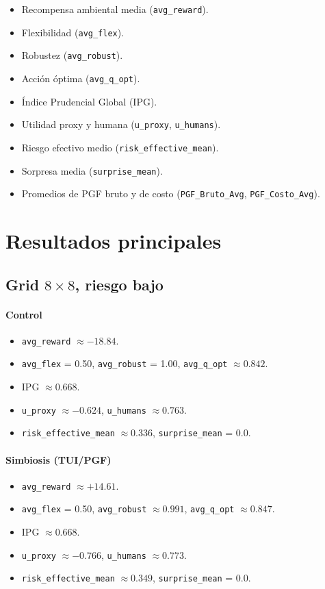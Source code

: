 \documentclass[11pt]{article}
\begin{document}
\begin{itemize}
  \item Recompensa ambiental media (\texttt{avg\_reward}).
  \item Flexibilidad (\texttt{avg\_flex}).
  \item Robustez (\texttt{avg\_robust}).
  \item Acción óptima (\texttt{avg\_q\_opt}).
  \item Índice Prudencial Global (IPG).
  \item Utilidad proxy y humana (\texttt{u\_proxy}, \texttt{u\_humans}).
  \item Riesgo efectivo medio (\texttt{risk\_effective\_mean}).
  \item Sorpresa media (\texttt{surprise\_mean}).
  \item Promedios de PGF bruto y de costo (\texttt{PGF\_Bruto\_Avg}, \texttt{PGF\_Costo\_Avg}).
\end{itemize}

\section{Resultados principales}

\subsection{Grid $8\times 8$, riesgo bajo}

\paragraph{Control}
\begin{itemize}
  \item \texttt{avg\_reward} $\approx -18.84$.
  \item \texttt{avg\_flex} = 0.50, \texttt{avg\_robust} = 1.00, \texttt{avg\_q\_opt} $\approx 0.842$.
  \item IPG $\approx 0.668$.
  \item \texttt{u\_proxy} $\approx -0.624$, \texttt{u\_humans} $\approx 0.763$.
  \item \texttt{risk\_effective\_mean} $\approx 0.336$, \texttt{surprise\_mean} = 0.0.
\end{itemize}

\paragraph{Simbiosis (TUI/PGF)}
\begin{itemize}
  \item \texttt{avg\_reward} $\approx +14.61$.
  \item \texttt{avg\_flex} = 0.50, \texttt{avg\_robust} $\approx 0.991$, \texttt{avg\_q\_opt} $\approx 0.847$.
  \item IPG $\approx 0.668$.
  \item \texttt{u\_proxy} $\approx -0.766$, \texttt{u\_humans} $\approx 0.773$.
  \item \texttt{risk\_effective\_mean} $\approx 0.349$, \texttt{surprise\_mean} = 0.0.
\end{itemize}
\end{document}
